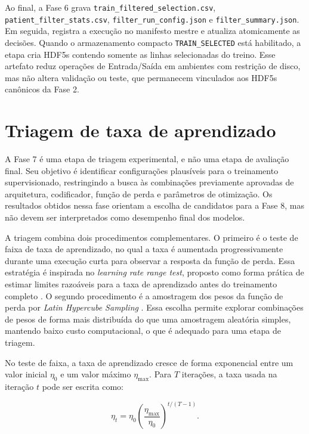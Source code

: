 Ao final, a Fase 6 grava \texttt{train\_filtered\_selection.csv},
\texttt{patient\_filter\_stats.csv}, \texttt{filter\_run\_config.json} e
\texttt{filter\_summary.json}. Em seguida, registra a execução no manifesto
mestre e atualiza atomicamente as decisões. Quando o armazenamento compacto
\texttt{TRAIN\_SELECTED} está habilitado, a etapa cria HDF5s contendo somente as
linhas selecionadas do treino. Esse artefato reduz operações de Entrada/Saída em ambientes com restrição de
disco, mas não altera validação ou teste, que permanecem vinculados aos HDF5s
canônicos da Fase 2.

\section{Triagem de taxa de aprendizado}\label{sec:met_lr_finder}

A Fase 7 é uma etapa de triagem experimental, e não uma etapa de avaliação
final. Seu objetivo é identificar configurações plausíveis para o treinamento
supervisionado, restringindo a busca às combinações previamente aprovadas de
arquitetura, codificador, função de perda e parâmetros de otimização. Os
resultados obtidos nessa fase orientam a escolha de candidatos para a Fase 8,
mas não devem ser interpretados como desempenho final dos modelos.

A triagem combina dois procedimentos complementares. O primeiro é o teste de
faixa de taxa de aprendizado, no qual a taxa é aumentada progressivamente
durante uma execução curta para observar a resposta da função de perda. Essa
estratégia é inspirada no \textit{learning rate range test}, proposto como forma
prática de estimar limites razoáveis para a taxa de aprendizado antes do
treinamento completo \cite{smith2017cyclical}. O segundo procedimento é a
amostragem dos pesos da função de perda por \textit{Latin Hypercube Sampling}
\cite{mckay1979comparison}. Essa escolha permite explorar combinações de pesos
de forma mais distribuída do que uma amostragem aleatória simples, mantendo baixo
custo computacional, o que é adequado para uma etapa de triagem.

No teste de faixa, a taxa de aprendizado cresce de forma exponencial entre um
valor inicial $\eta_0$ e um valor máximo $\eta_{\max}$. Para $T$ iterações, a
taxa usada na iteração $t$ pode ser escrita como:

\begin{equation}
    \eta_t =
    \eta_0
    \left(
    \frac{\eta_{\max}}{\eta_0}
    \right)^{t/(T-1)} .
    \label{eq:lr_exponencial}
\end{equation}

